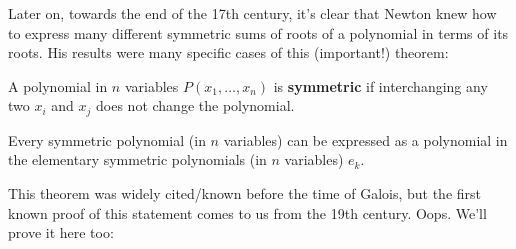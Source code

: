 \documentclass[12pt]{scrartcl}
\begin{document}
Later on, towards the end of the 17th century, it's clear that Newton knew how to express many different symmetric sums of roots of a polynomial in terms of its roots. His results were many specific cases of this (important!) theorem:
\begin{definition}
	A polynomial in $n$ variables $P(x_1, \dots, x_n)$ is \textbf{symmetric} if interchanging any two $x_i$ and $x_j$ does not change the polynomial.
\end{definition}
\begin{theorem}
	Every symmetric polynomial (in $n$ variables) can be expressed as a polynomial in the elementary symmetric polynomials (in $n$ variables) $e_k$.
\end{theorem}
This theorem was widely cited/known before the time of Galois, but the first known proof of this statement comes to us from the 19th century. Oops. We'll prove it here too:
\end{document}
